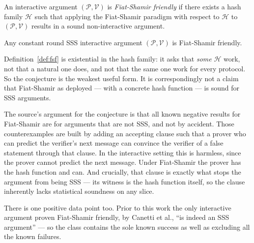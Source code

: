 \documentclass{aicr-conjecture}
\newcommand{\Prover}{\mathcal{P}}
\newcommand{\Verifier}{\mathcal{V}}
\begin{document}
\begin{definition}\label{def:fsf}
An interactive argument $(\Prover, \Verifier)$ is \emph{Fiat-Shamir
friendly} if there exists a hash family $\mathcal{H}$ such that applying
the Fiat-Shamir paradigm with respect to $\mathcal{H}$ to $(\Prover,
\Verifier)$ results in a sound non-interactive argument.
\end{definition}

\begin{conjecture}\label{conj:main}
Any constant round SSS interactive argument $(\Prover, \Verifier)$ is
Fiat-Shamir friendly.
\end{conjecture}

\begin{remark}\label{rem:existential}
Definition~\ref{def:fsf} is existential in the hash family: it asks that
\emph{some} $\mathcal{H}$ work, not that a natural one does, and not that
the same one work for every protocol. So the conjecture is the weakest
useful form. It is correspondingly not a claim that Fiat-Shamir as
deployed --- with a concrete hash function --- is sound for SSS arguments.
\end{remark}

\begin{remark}\label{rem:evidence}
The source's argument for the conjecture is that all known negative
results for Fiat-Shamir are for arguments that are not SSS, and not by
accident. Those counterexamples are built by adding an accepting clause
such that a prover who can predict the verifier's next message can
convince the verifier of a false statement through that clause. In the
interactive setting this is harmless, since the prover cannot predict the
next message. Under Fiat-Shamir the prover has the hash function and can.
And crucially, that clause is exactly what stops the argument from
being SSS --- its witness is the hash function itself, so the clause
inherently lacks statistical soundness on any slice.

There is one positive data point too. Prior to this work the only
interactive argument proven Fiat-Shamir friendly, by Canetti et al., ``is
indeed an SSS argument'' --- so the class contains the sole known success
as well as excluding all the known failures.
\end{remark}
\end{document}
